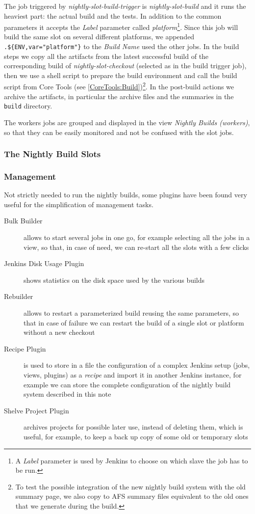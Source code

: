 \documentclass{lhcbnote}
\begin{document}
The job triggered by \emph{nightly-slot-build-trigger} is
\emph{nightly-slot-build} and it runs the heaviest part: the actual build and
the tests.  In addition to the common parameters it accepts the \emph{Label}
parameter called \emph{platform}\footnote{A \emph{Label} parameter is used by
Jenkins to choose on which slave the job has to be run.}.  Since this job will
build the same slot on several different platforms, we appended
\verb|.${ENV,var="platform"}| to the \emph{Build Name} used the other jobs.  In
the build steps we copy all the artifacts from the latest successful build of
the corresponding build of \emph{nightly-slot-checkout} (selected as in the
build trigger job), then we use a shell script to prepare the build environment
and call the build script from Core Tools (see
\ref{CoreTools:Build})\footnote{To test the possible integration of the new
nightly build system with the old summary page, we also copy to AFS summary
files equivalent to the old ones that we generate during the build.}.  In the
post-build actions we archive the artifacts, in particular the archive files and
the summaries in the \texttt{build} directory.

The workers jobs are grouped and displayed in the view \emph{Nightly Builds (workers)}, so that they can be easily monitored and not be confused with the slot jobs.

\subsubsection{The Nightly Build Slots}
\label{Jenkins:Slots}


\subsubsection{Management}
\label{Jenkins:Management}
Not strictly needed to run the nightly builds, some plugins have been found very useful for the simplification of management tasks.
\begin{description}
  \item[Bulk Builder] allows to start several jobs in one go, for example selecting all the jobs in a view, so that, in case of need, we can re-start all the slots with a few clicks
  \item[Jenkins Disk Usage Plugin] shows statistics on the disk space used by the various builds
  \item[Rebuilder] allows to restart a parameterized build reusing the same parameters, so that in case of failure we can restart the build of a single slot or platform without a new checkout
  \item[Recipe Plugin] is used to store in a file the configuration of a complex Jenkins setup (jobs, views, plugins) as a \emph{recipe} and import it in another Jenkins instance, for example we can store the complete configuration of the nightly build system described in this note
  \item[Shelve Project Plugin] archives projects for possible later use, instead of deleting them, which is useful, for example, to keep a back up copy of some old or temporary slots
\end{description}
\end{document}
